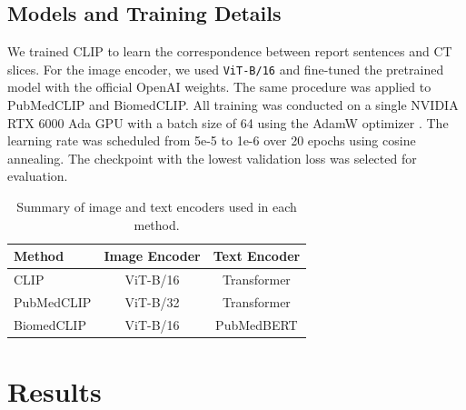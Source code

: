 \documentclass[bioengineering,article,submit,pdftex,moreauthors]{Definitions/mdpi}
\begin{document}
\subsection{Models and Training Details}
We trained CLIP to learn the correspondence between report sentences and CT slices. 
For the image encoder, we used \texttt{ViT-B/16} and fine-tuned the pretrained model with the official OpenAI weights. 
The same procedure was applied to PubMedCLIP and BiomedCLIP. 
All training was conducted on a single NVIDIA RTX 6000 Ada GPU with a batch size of 64 using the AdamW optimizer \cite{loshchilov_fixing_2017}. 
The learning rate was scheduled from 5e-5 to 1e-6 over 20 epochs using cosine annealing. 
The checkpoint with the lowest validation loss was selected for evaluation.

\begin{table}[ht]
  \centering
  \caption{Summary of image and text encoders used in each method.}
  \label{tab:model_summary}
  \begin{tabular}{lcc}
    \toprule
    Method                  & Image Encoder      & Text Encoder      \\
    \midrule
    CLIP                    & ViT-B/16          & Transformer       \\
    PubMedCLIP              & ViT-B/32          & Transformer       \\
    BiomedCLIP              & ViT-B/16          & PubMedBERT        \\
    \bottomrule
  \end{tabular}
\end{table}


\section{Results}
\end{document}
